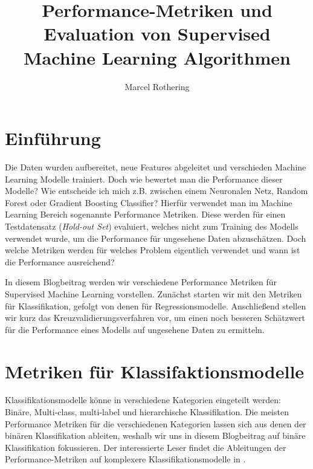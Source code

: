 \documentclass[twoside=true, openright, pdftex, bibliography=totoc, chapterprefix=true, appendixprefix=true, numbers=noenddot, parskip=half, titlepage, index=totoc, headlines=3, footlines=2, headings=normal, language=german]{scrartcl}
\author{Marcel Rothering}
\title{Performance-Metriken und Evaluation von Supervised Machine Learning Algorithmen}
\begin{document}
\maketitle
\section{Einführung}
Die Daten wurden aufbereitet, neue Features abgeleitet und verschieden Machine Learning Modelle trainiert. Doch wie bewertet man die Performance dieser Modelle? Wie entscheide ich mich z.B. zwischen einem Neuronalen Netz, Random Forest oder Gradient Boosting Classifier? Hierfür verwendet man im Machine Learning Bereich sogenannte Performance Metriken. Diese werden für einen Testdatensatz (\textit{Hold-out Set}) evaluiert, welches nicht zum Training des Modells verwendet wurde, um die Performance für ungesehene Daten abzuschätzen. Doch welche Metriken werden für welches Problem eigentlich verwendet und wann ist die Performance ausreichend?

In diesem Blogbeitrag werden wir verschiedene Performance Metriken für Supervised Machine Learning vorstellen. Zunächst starten wir mit den Metriken für Klassifikation, gefolgt von denen für Regressionsmodelle. Anschließend stellen wir kurz das Kreuzvalidierungsverfahren vor, um einen noch besseren Schätzwert für die Performance eines Modells auf ungesehene Daten zu ermitteln. 

\section{Metriken für Klassifaktionsmodelle}
Klassifikationsmodelle könne in verschiedene Kategorien eingeteilt werden: Binäre, Multi-class, multi-label und hierarchische Klassifikation. Die meisten Performance Metriken für die verschiedenen Kategorien lassen sich aus denen der binären Klassifikation ableiten, weshalb wir uns in diesem Blogbeitrag auf binäre Klassifikation fokussieren. Der interessierte Leser findet die Ableitungen der Performance-Metriken auf komplexere Klassifikationsmodelle in \cite{Sokolova:2009:SAP:1542545.1542682}.
\end{document}
